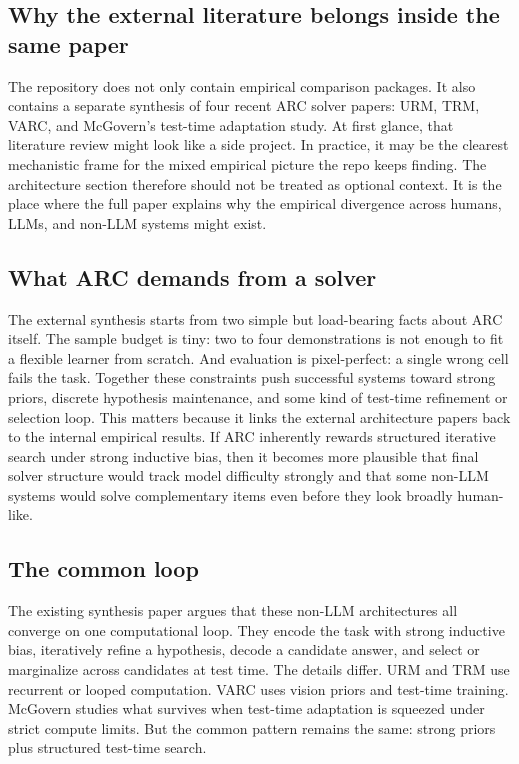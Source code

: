\documentclass[11pt,letterpaper]{article}
\begin{document}
\subsection{Why the external literature belongs inside the same paper}

The repository does not only contain empirical comparison packages. It also contains a separate synthesis of four recent ARC solver papers: URM, TRM, VARC, and McGovern's test-time adaptation study. At first glance, that literature review might look like a side project. In practice, it may be the clearest mechanistic frame for the mixed empirical picture the repo keeps finding. The architecture section therefore should not be treated as optional context. It is the place where the full paper explains why the empirical divergence across humans, LLMs, and non-LLM systems might exist.

\subsection{What ARC demands from a solver}

The external synthesis starts from two simple but load-bearing facts about ARC itself. The sample budget is tiny: two to four demonstrations is not enough to fit a flexible learner from scratch. And evaluation is pixel-perfect: a single wrong cell fails the task. Together these constraints push successful systems toward strong priors, discrete hypothesis maintenance, and some kind of test-time refinement or selection loop. This matters because it links the external architecture papers back to the internal empirical results. If ARC inherently rewards structured iterative search under strong inductive bias, then it becomes more plausible that final solver structure would track model difficulty strongly and that some non-LLM systems would solve complementary items even before they look broadly human-like.

\subsection{The common loop}

The existing synthesis paper argues that these non-LLM architectures all converge on one computational loop. They encode the task with strong inductive bias, iteratively refine a hypothesis, decode a candidate answer, and select or marginalize across candidates at test time. The details differ. URM and TRM use recurrent or looped computation. VARC uses vision priors and test-time training. McGovern studies what survives when test-time adaptation is squeezed under strict compute limits. But the common pattern remains the same: strong priors plus structured test-time search.
\end{document}
